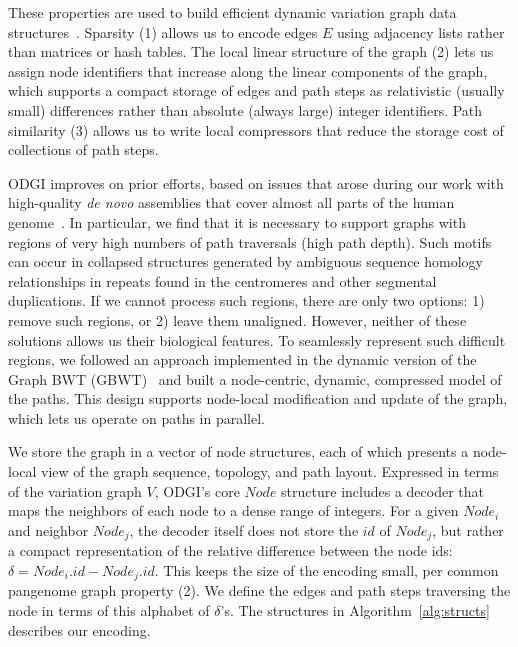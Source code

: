 \documentclass{bioinfo}
\newcommand{\red}[1]{{\textcolor{Red}{#1}}}
\newcommand{\FIXME}[1]{\red{[FIXME: #1]}}
\begin{document}
These properties are used to build efficient dynamic variation graph data structures~\citep{Siren:2020,Eizenga_2020_BX}.
Sparsity (1) allows us to encode edges $E$ using adjacency lists rather than matrices or hash tables.
The local linear structure of the graph (2) lets us assign node identifiers that increase along the linear components of the graph, which supports a compact storage of edges and path steps as relativistic (usually small) differences rather than absolute (always large) integer identifiers.
Path similarity (3) allows us to write local compressors that reduce the storage cost of collections of path steps.

ODGI improves on prior efforts, based on issues that arose during our work with high-quality \textit{de novo} assemblies that cover almost all parts of the human genome~\citep{Logsdon_2021,Nurk_2021}.
In particular, we find that it is necessary to support graphs with regions of very high numbers of path traversals (high path depth).
Such motifs can occur in collapsed structures generated by ambiguous sequence homology relationships in repeats found in the centromeres and other segmental duplications.
If we cannot process such regions, there are only two options: 1) remove such regions, or 2) leave them unaligned.
However, neither of these solutions allows us  their biological features.
To seamlessly represent such difficult regions, we followed an approach implemented in the dynamic version of the Graph BWT (GBWT)~\citep{Siren:2020} and built a node-centric, dynamic, compressed model of the paths.
This design supports node-local modification and update of the graph, which lets us operate on paths in parallel.

We store the graph in a vector of node structures, each of which presents a node-local view of the graph sequence, topology, and path layout.
Expressed in terms of the variation graph $V$, ODGI's core $Node$ structure includes a decoder that maps the neighbors of each node to a dense range of integers.
For a given $Node_i$ and neighbor $Node_j$, the decoder itself does not store the $id$ of $Node_j$, but rather a compact representation of the relative difference between the node ids: $\delta = Node_i.id - Node_j.id$.
This keeps the size of the encoding small, per common pangenome graph property (2).
We define the edges and path steps traversing the node in terms of this alphabet of $\delta$'s.
The structures in Algorithm~\ref{alg:structs} describes our encoding.
\end{document}
